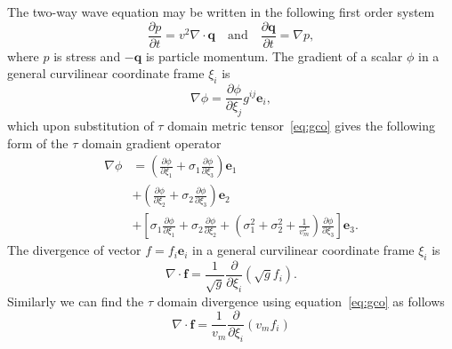 The two-way wave equation may be written in the following first order system
\begin{equation}
\label{eq:wisoC}
\frac{\partial p}{\partial t} = v^2 \nabla\cdot\mathbf{q}
\quad \mathrm{and} \quad
\frac{\partial \mathbf{q}}{\partial t} = \nabla p ,
\end{equation}
where $p$ is stress and $-\mathbf{q}$ is particle momentum.
The gradient of a scalar $\phi$ in a general curvilinear coordinate frame $\xi_i$ is
\begin{equation}
\nabla \phi = \frac{\partial \phi}{\partial \xi_j} g^{ij} \mathbf{e}_i ,
\end{equation}
which upon substitution of $\tau$ domain metric tensor~\ref{eq:gco} gives the following form of the $\tau$ domain gradient operator
\begin{align}
\label{eq:grad}
\nabla \phi
& = \left(\frac{\partial \phi}{\partial \xi_1} + \sigma_1 \frac{\partial \phi}{\partial \xi_3} \right) \mathbf{e}_1 \nonumber \\
& + \left(\frac{\partial \phi}{\partial \xi_2} + \sigma_2 \frac{\partial \phi}{\partial \xi_3} \right)\mathbf{e}_2 \\
& + \left[\sigma_1 \frac{\partial \phi}{\partial \xi_1} + \sigma_2 \frac{\partial \phi}{\partial \xi_2} + \left(\sigma_1^2 + \sigma_2^2 + \frac{1}{v_m^2}\right)\frac{\partial \phi}{\partial \xi_3} \right]\mathbf{e}_3 \nonumber .
\end{align}
The divergence of vector $f = f_i\mathbf{e}_i$ in a general curvilinear coordinate frame $\xi_i$ is
\begin{equation}
\nabla \cdot \mathbf{f} =  \frac{1}{\sqrt{g}} \frac{\partial}{\partial \xi_i}\left(\sqrt{g} f_i\right) .
\end{equation}
Similarly we can find the $\tau$ domain divergence using equation~\ref{eq:gco} as follows
\begin{equation}
\label{eq:div}
\nabla \cdot \mathbf{f} = \frac{1}{v_m} \frac{\partial}{\partial \xi_i} \left(v_m f_i\right)
\end{equation}

